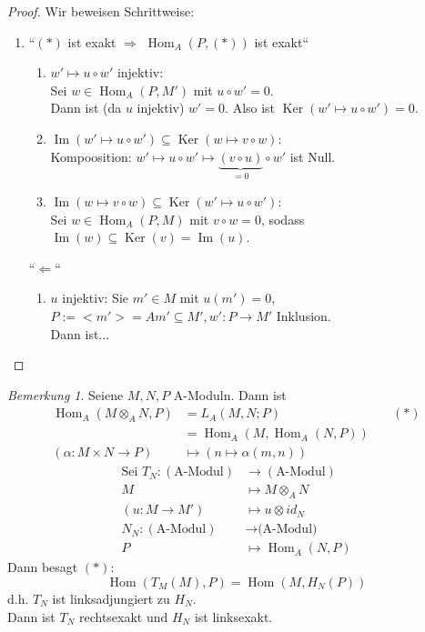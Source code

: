 \documentclass[10pt,a4paper]{article}
\newcommand{\al}{\ensuremath{\alpha}}
\newcommand{\Hom}{\operatorname{Hom}}
\newcommand{\Ker}{\ensuremath{\operatorname{Ker}}}
\newcommand{\Img}{\ensuremath{\operatorname{Im}}}
\newcounter{thm}[section]
\theoremstyle{definition}
\theoremstyle{plain}
\theoremstyle{remark}
\newtheorem{bem}[thm]{Bemerkung}
\begin{document}
\begin{proof}Wir beweisen Schrittweise:
	\begin{enumerate}
		\item ``$(*)$ ist exakt $\Rightarrow$ $\Hom_A(P,(*))$ ist exakt``
		\begin{enumerate}
				\item $w'\mapsto u\circ w'$ injektiv:\\
				Sei $w\in\Hom_A(P,M')$ mit $u\circ w'=0$.\\
				Dann ist (da $u$ injektiv) $w'=0$. Also ist $\Ker(w'\mapsto u\circ w')=0.$
				\item $\Img(w'\mapsto u\circ w')\subseteq\Ker(w\mapsto v\circ w)$:\\
				Kompoosition: $w'\mapsto u\circ w'\mapsto \underbrace{(v\circ u)}_{=0}\circ w'$ ist Null.
				\item $\Img(w\mapsto v\circ w)\subseteq\Ker(w'\mapsto u\circ w')$:\\
				Sei $w\in\Hom_A(P,M)$ mit $v\circ w=0$, sodass $\Img(w)\subseteq\Ker(v)=\Img(u)$.
			\end{enumerate}
			\begin{center}
			\end{center}
			``$\Leftarrow$``
			\begin{enumerate}
				\item $u$ injektiv: Sie $m'\in M$ mit $u(m')=0$, $P:=<m'>=Am'\subseteq M',w':P\rightarrow M'$ Inklusion.\\
				Dann ist...
			\end{enumerate}
	\end{enumerate}
\end{proof}
\begin{bem}
	\label{bem313}
	Seiene $M,N,P$ A-Moduln. Dann ist
	\begin{align*}
	\Hom_A(M\otimes_A N,P)&=L_A(M,N;P)&\quad (*)\\
	&=\Hom_A(M,\Hom_A(N,P))\\
	(\al:M\times N\rightarrow P)&\mapsto (n\mapsto \al(m,n))
	\end{align*}
	\begin{align*}
	\text{Sei }T_N:(\text{A-Modul})&\rightarrow (\text{A-Modul})\\
	M&\mapsto M\otimes_AN\\
	(u:M\rightarrow M')&\mapsto u\otimes id_N\\
	N_N:(\text{A-Modul})&\rightarrow \text{(A-Modul)}\\
	P&\mapsto \Hom_A(N,P)
	\end{align*}
	Dann besagt $(*)$:
	\[\Hom(T_M(M),P)=\Hom(M,H_N(P))\]
	d.h. $T_N$ ist linksadjungiert zu $H_N$.\\
	Dann ist $T_N$ rechtsexakt und $H_N$ ist linksexakt.
\end{bem}
\end{document}
